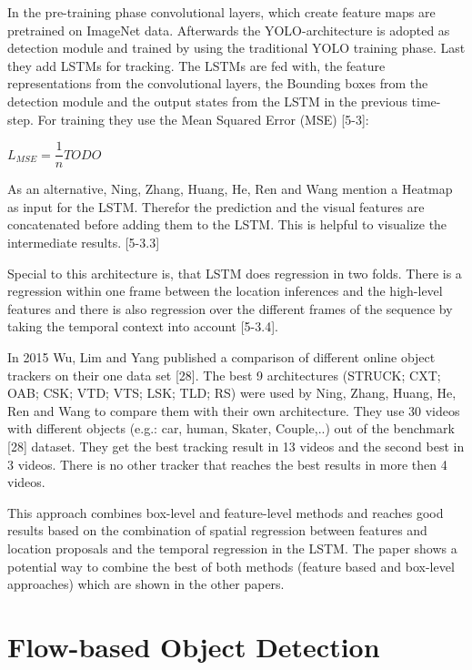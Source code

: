 \documentclass[conference]{IEEEtran}
\begin{document}
In the pre-training phase convolutional layers, which create feature maps are pretrained on ImageNet data. Afterwards the YOLO-architecture is adopted as detection module and trained by using the traditional YOLO training phase. Last they add LSTMs for tracking. The LSTMs are fed with, the feature representations from the convolutional layers, the Bounding boxes from the detection module and the output states from the LSTM in the previous time-step. For training they use the Mean Squared Error (MSE) [5-3]: \newline

$ L_{MSE} = \dfrac{1}{n} TODO $ \newline

As an alternative, Ning, Zhang, Huang, He, Ren and Wang mention a Heatmap as  input for the LSTM. Therefor the prediction and the visual features are concatenated before adding them to the LSTM. This is helpful to visualize the intermediate results. [5-3.3] \newline

Special to this architecture is, that LSTM does regression in two folds. There is a regression within one frame between the location inferences and the high-level features and there is also regression over the different frames of the sequence by taking the temporal context into account [5-3.4].  \newline

In 2015 Wu, Lim and Yang published a comparison of different online object trackers on their one data set [28]. The best 9 architectures (STRUCK; CXT; OAB; CSK; VTD; VTS; LSK; TLD; RS) were used by Ning, Zhang, Huang, He, Ren and Wang to compare them with their own architecture. They use 30 videos with different objects (e.g.: car, human, Skater, Couple,..) out of the benchmark [28] dataset. They get the best tracking result in 13 videos and the second best in 3 videos. There is no other tracker that reaches the best results in more then 4 videos. \newline

This approach combines box-level and feature-level methods and reaches good results based on the combination of spatial regression between features and location proposals and the temporal regression in the LSTM. The paper shows a potential way to combine the best of both methods (feature based and box-level approaches) which are shown in the other papers. 

\section{Flow-based Object Detection}
\end{document}
